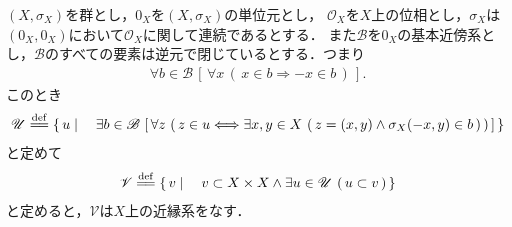 	\begin{screen}
		\begin{thm}[加法がゼロで連続ならば近縁系が作られる]
		\label{thm:summation_is_continuous_at_zero_then_there_exists_a_entourages}
			$\left(X,\sigma_X\right)$を群とし，$0_X$を$\left(X,\sigma_X\right)$の単位元とし，
			$\mathscr{O}_X$を$X$上の位相とし，$\sigma_X$は$(0_X,0_X)$において$\mathscr{O}_X$に関して連続であるとする．
			また$\mathscr{B}$を$0_X$の基本近傍系とし，$\mathscr{B}$のすべての要素は逆元で閉じているとする．つまり
			\begin{align}
				\forall b \in \mathscr{B}\, \left[\, \forall x\, (\, x \in b \Longrightarrow -x \in b\, )\, \right].
			\end{align}
			このとき
			\begin{align}
				\mathscr{U} \defeq \Set{u}{\exists b \in \mathscr{B}\,
				\left[\, \forall z\, \left(\, z \in u \Longleftrightarrow \exists x,y \in X\, 
				\left(\, z=(x,y) \wedge \sigma_X(-x,y) \in b\, \right)\, \right)\, \right]}
			\end{align}
			と定めて
			\begin{align}
				\mathscr{V} \defeq \Set{v}{v \subset X \times X \wedge \exists u \in \mathscr{U}\, 
				\left(\, u \subset v\, \right)}
			\end{align}
			と定めると，$\mathscr{V}$は$X$上の近縁系をなす．
		\end{thm}
	\end{screen}
	
